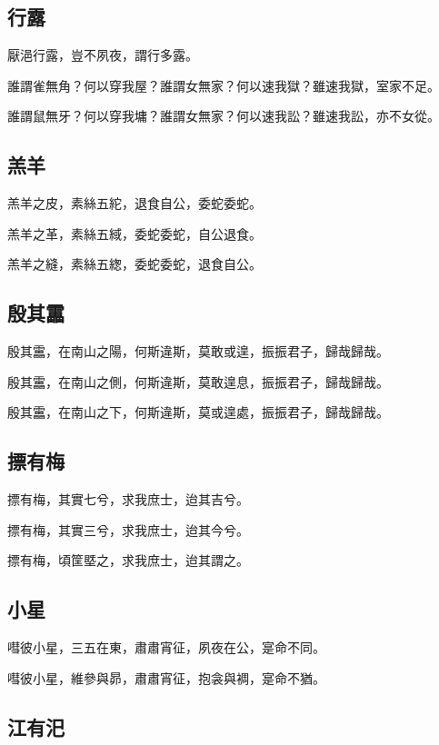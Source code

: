 \subsection[行露]{行露}

厭浥行露，豈不夙夜，謂行多露。

誰謂雀無角？何以穿我屋？誰謂女無家？何以速我獄？雖速我獄，室家不足。

誰謂鼠無牙？何以穿我墉？誰謂女無家？何以速我訟？雖速我訟，亦不女從。

\subsection[羔羊]{羔羊}

羔羊之皮，素絲五紽，退食自公，委蛇委蛇。

羔羊之革，素絲五緎，委蛇委蛇，自公退食。

羔羊之縫，素絲五緫，委蛇委蛇，退食自公。

\subsection[殷其靁]{殷其靁}

殷其靁，在南山之陽，何斯違斯，莫敢或遑，振振君子，歸哉歸哉。

殷其靁，在南山之側，何斯違斯，莫敢遑息，振振君子，歸哉歸哉。

殷其靁，在南山之下，何斯違斯，莫或遑處，振振君子，歸哉歸哉。

\subsection[摽有梅]{摽有梅}

摽有梅，其實七兮，求我庶士，迨其吉兮。

摽有梅，其實三兮，求我庶士，迨其今兮。

摽有梅，頃筐塈之，求我庶士，迨其謂之。

\subsection[小星]{小星}

嘒彼小星，三五在東，肅肅宵征，夙夜在公，寔命不同。

嘒彼小星，維參與昴，肅肅宵征，抱衾與裯，寔命不猶。

\subsection[江有汜]{江有汜}

